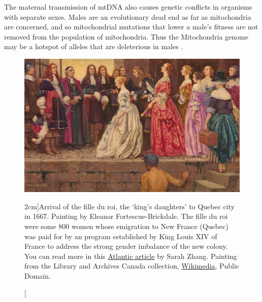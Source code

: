 {The maternal transmission of mtDNA also causes genetic conflicts in organisms
with separate sexes. Males are an evolutionary dead end as far as
mitochondria are concerned, and so mitochondrial mutations that lower a male's
fitness are not removed from the population of mitochondria. Thus the
Mitochondria genome may be a hotspot of alleles that are deleterious in males
\citep[an effect termed the ``Mother's curse''][]{}.
 \begin{figure}
\begin{center}
  \includegraphics[width= \textwidth]{illustration_images/single_locus_selection/fille_du_roi/fille_du_roi.png}
\end{center}
\caption[][2cm]{Arrival of the fille du roi, the `king's daughters' to
  Quebec city in 1667. Painting
  by Eleanor Fortescue-Brickdale.  The fille du roi were some 800 women whose emigration to New France (Quebec) was paid for by an program established by
  King Louis XIV of France to address the strong gender imbalance of
  the new colony. You can read more in this \href{https://www.theatlantic.com/science/archive/2017/09/how-a-fille-du-roy-brought-the-mothers-curse-to-canada/540153/}{Atlantic article} by Sarah Zhang.
\newline \noindent \tiny{
 Painting from the Library and Archives Canada collection,
 \href{https://commons.wikimedia.org/wiki/File:Arrival_of_the_Brides_-_Eleanor_Fortescue-Brickdale.png}{Wikimedia},
 Public Domain.}} \label{fig:fille_du_roi}  %
\end{figure}
}
